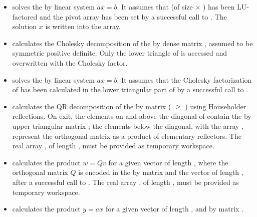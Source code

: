 \begin{itemize}
\item {}
  \par {} solves the  by  linear system $ax = b$. 
  It assumes that  (of size  $\times$ ) has been LU-factored 
  and the pivot array  has been set by a successful call to 
  . The solution $x$ is written into the  array.

\item {}
  \par {} calculates the Cholesky decomposition of the  by 
  dense matrix , assumed to be symmetric positive definite. Only the lower triangle
  of  is accessed and overwritten with the Cholesky factor.

\item {}
  \par {} solves the  by  linear system $ax = b$.
  It assumes that the Cholesky factorization of  has been calculated in the
  lower triangular part of  by a successful call to .

\item {}
  \par {} calculates the QR decomposition of the  by 
  matrix  ( $\ge$ ) using Householder reflections. On exit, the elements
  on and above the diagonal of  contain the  by  upper triangular matrix ;
  the elements below the diagonal, with the array , represent the orthogonal matrix 
  as a product of elementary reflectors. The real array , of length , must be provided
  as temporary workspace.

\item {}
  \par {} calculates the product $w = Qv$ for a given vector
   of length , where the orthogonal matrix $Q$ is encoded in the  by 
  matrix  and the vector  of length , after a successful call to
  . The real array , of length , must be provided
  as temporary workspace.

\item {}
  \par {} calculates the product $y = ax$ for a given vector
   of length , and  by  matrix .

\end{itemize}


